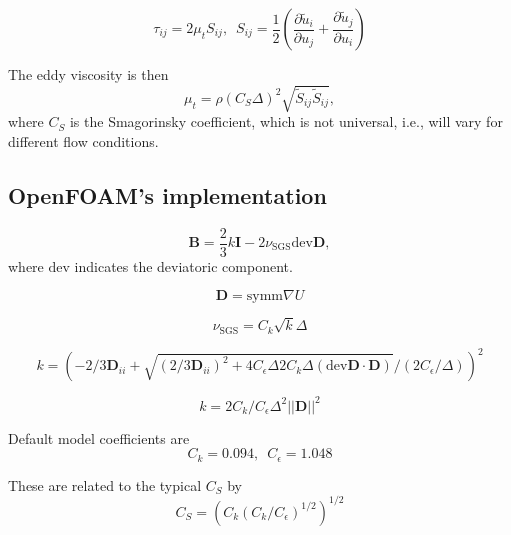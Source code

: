 \begin{equation}
    \tau_{ij} = 2 \mu_t S_{ij}, \, \, \,
    S_{ij} = \frac{1}{2}
    \left(
    \frac{\partial \tilde{u}_i}{\partial u_j}
    + \frac{\partial \tilde{u}_j}{\partial u_i}
    \right)
\end{equation}

The eddy viscosity is then
\begin{equation}
    \mu_t = \rho (C_S \Delta)^2 \sqrt{\tilde{S}_{ij} \tilde{S}_{ij}},
\end{equation}
where $C_S$ is the Smagorinsky coefficient, which is not universal, i.e., will
vary for different flow conditions.


\subsection{OpenFOAM's implementation}


\begin{equation}
    \mathbf{B} = \frac{2}{3}k \mathbf{I}
    - 2 \nu_{\mathrm{SGS}} \mathrm{dev} \mathbf{D},
\end{equation}
where $\mathrm{dev}$ indicates the deviatoric component.

\begin{equation}
    \mathbf{D} = \mathrm{symm} \nabla U
\end{equation}

\begin{equation}
    \nu_{\mathrm{SGS}} = C_k \sqrt{k} \Delta
\end{equation}

\begin{equation}
    k =
    (
    -2/3 \mathbf{D}_{ii} + \sqrt{(2/3 \mathbf{D}_{ii})^2
    + 4C_\epsilon \Delta 2 C_k \Delta
    (\mathrm{dev} \mathbf{D} \cdot \mathbf{D})}
    / (2 C_\epsilon / \Delta)
    )^2
\end{equation}

\begin{equation}
    k = 2 C_k/C_\epsilon \Delta^2 ||\mathbf{D}||^2
\end{equation}

Default model coefficients are
\begin{equation}
    C_k = 0.094, \, \, \,
    C_\epsilon = 1.048
\end{equation}

These are related to the typical $C_S$ by
\begin{equation}
    C_S =
    \left(
        C_k \left(C_k / C_\epsilon \right)^{1/2}
    \right)^{1/2}
\end{equation}
